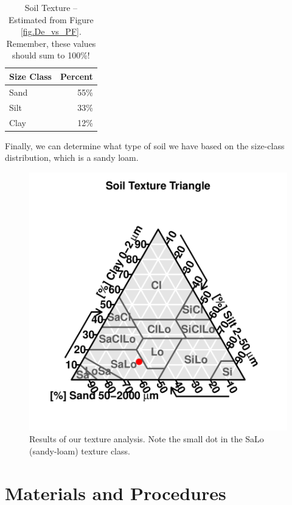 \documentclass{tufte-handout}
\begin{document}
\begin{table}

		\begin{tabular}{lr}\hline
Size Class 	&		Percent		\\ \hline\hline
Sand				& 	55\% \\
Silt				&   33\% \\
Clay				& 	12\% \\ \hline		
		\end{tabular}
	\caption{Soil Texture -- Estimated from Figure \ref{fig.De_vs_PF}. Remember, these values should sum to 100\%!}
	\label{tab:SoilTexture}
\end{table}

Finally, we can determine what type of soil we have based on the size-class distribution, which is a sandy loam. 


\begin{figure}
\includegraphics{Particle_Size_Analysis-TTPlot}
\caption{Results of our texture analysis. Note the small dot in the SaLo (sandy-loam) texture class.}
\label{fig.simplifiedfig}
\end{figure}



\clearpage
\section{Materials and Procedures}
\end{document}

